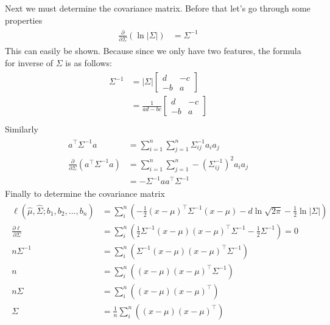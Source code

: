 \begin{Parts}
\begin{solution}
    Next we must determine the covariance matrix. Before that let's go through some properties
    \begin{align}
        \begin{aligned}
        \frac{\partial}{\partial \Sigma} (\ln |\Sigma|) &= \Sigma^{-1}
        \end{aligned}
    \end{align}
    This can easily be shown. Because since we only have two features, the formula for inverse of $\Sigma$ is as follows:
    \begin{align}
        \begin{aligned}
            \Sigma ^{-1} &= |\Sigma| \begin{bmatrix}
            d & -c\\
            -b & a
            \end{bmatrix}\\
            & = \frac{1}{ad-bc} \begin{bmatrix}
            d & -c\\
            -b & a
            \end{bmatrix}\\
        \end{aligned}
    \end{align}Similarly
    \begin{align}
        \begin{aligned}
            a^{\top}\Sigma^{-1}a &= \sum^n_{i=1}\sum^n_{j=1}\Sigma^{-1}_{ij} a_i a_j\\
            \frac{\partial}{\partial \Sigma} (a^{\top}\Sigma^{-1}a) &= \sum^n_{i=1}\sum^n_{j=1}-(\Sigma^{-1}_{ij})^2 a_i a_j\\
            &= -\Sigma^{-1}aa^{\top}\Sigma^{-1}
        \end{aligned}
    \end{align}
    Finally to determine the covariance matrix
    \begin{align}
        \begin{aligned}
            \ell(\hat{\mu},\hat{\Sigma};b_1, b_2,..., b_n) &= \sum_i^n (-\frac{1}{2}(x - \mu)^{\top}\Sigma^{-1}(x- \mu) - d\ln \sqrt{2 \pi} - \frac{1}{2}\ln |\Sigma|)\\
            \frac{\partial \ell}{\partial \Sigma} &= \sum_i^n (\frac{1}{2}\Sigma^{-1}(x - \mu)(x- \mu)^{\top}\Sigma^{-1} - \frac{1}{2}\Sigma^{-1}) = 0\\
            n\Sigma^{-1} &= \sum_i^n (\Sigma^{-1}(x - \mu)(x- \mu)^{\top}\Sigma^{-1})\\
            n &= \sum_i^n ((x - \mu)(x- \mu)^{\top}\Sigma^{-1})\\
            n\Sigma &= \sum_i^n ((x - \mu)(x- \mu)^{\top})\\
            \Sigma &= \frac{1}{n}\sum_i^n ((x - \mu)(x- \mu)^{\top})\\
        \end{aligned}
    \end{align}
\end{solution}


\end{Parts}

